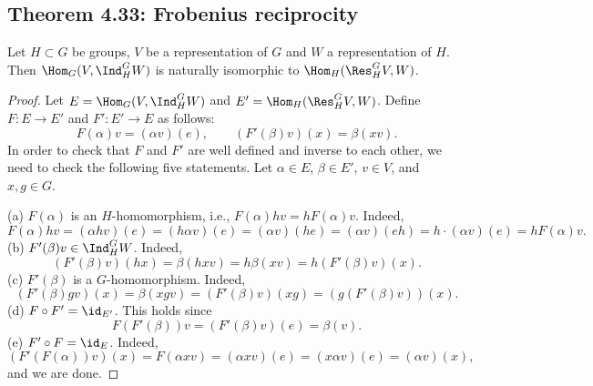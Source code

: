 \subsection*{Theorem 4.33: Frobenius reciprocity}
\begin{theorem}[4.33]
Let $H\subset G$ be groups, $V$ be a representation of $G$ and $W$ a representation of $H$. Then $\Hom_G(V,\Ind_H^G W)$ is naturally isomorphic to $\Hom_H(\Res_H^G V,W)$.
\end{theorem}
\begin{proof}
Let $E=\Hom_G(V,\Ind_H^G W)$ and $E'=\Hom_H(\Res_H^G V,W)$.
Define $F:E\to E'$ and $F':E'\to E$ as follows:
\[
F(\alpha)v=(\alpha v)(e),\qquad (F'(\beta)v)(x)=\beta(xv).
\]
In order to check that $F$ and $F'$ are well defined and inverse to each other, we need to check the following five statements. Let $\alpha\in E$, $\beta\in E'$, $v\in V$, and $x,g\in G$.

(a) $F(\alpha)$ is an $H$-homomorphism, i.e., $F(\alpha)hv=hF(\alpha)v$. Indeed,
\[
F(\alpha)hv=(\alpha hv)(e)=(h\alpha v)(e)=(\alpha v)(he)=(\alpha v)(eh)=h\cdot(\alpha v)(e)=hF(\alpha)v.
\]
(b) $F'(\beta)v\in\Ind_H^G W$. Indeed,
\[
(F'(\beta)v)(hx)=\beta(hxv)=h\beta(xv)=h(F'(\beta)v)(x).
\]
(c) $F'(\beta)$ is a $G$-homomorphism. Indeed,
\[
(F'(\beta)gv)(x)=\beta(xgv)=(F'(\beta)v)(xg)=(g(F'(\beta)v))(x).
\]
(d) $F\circ F'=\id_{E'}$. This holds since
\[
F(F'(\beta))v=(F'(\beta)v)(e)=\beta(v).
\]
(e) $F'\circ F=\id_E$. Indeed,
\[
(F'(F(\alpha))v)(x)=F(\alpha xv)=(\alpha xv)(e)=(x\alpha v)(e)=(\alpha v)(x),
\]
and we are done.
\end{proof}

